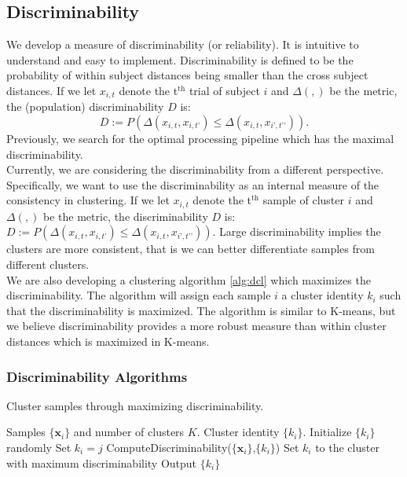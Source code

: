 \documentclass[simplex.tex]{subfiles}
\providecommand{\mb}[1]{\boldsymbol{#1}}
\newcommand{\bx}{\mb{x}}
\begin{document}
\subsection{Discriminability}
We develop a measure of discriminability (or reliability).  It
is intuitive to understand and easy to implement.
Discriminability is defined to be the probability of within
subject distances being smaller than the cross subject
distances. If we let $x_{i,t}$ denote the t$^{\text{th}}$ trial of subject 
$i$ and $\Delta(,)$ be the metric, the (population) discriminability $D$
is: 
\[D:= P (\Delta(x_{i,t} , x_{i,t’}) \leq  \Delta(x_{i,t} , x_{i’,t’’})).\]
Previously, we search for the optimal processing pipeline which has the
maximal discriminability. 
\\
Currently, we are considering the discriminability from a different perspective. Specifically, we want to use the discriminability as an internal measure of the consistency in clustering. If we let $x_{i,t}$ denote the t$^{\text{th}}$ sample of cluster 
$i$ and $\Delta(,)$ be the metric, the discriminability $D$
is: $D:= P (\Delta(x_{i,t} , x_{i,t’}) \leq  \Delta(x_{i,t} , x_{i’,t’’}))$. Large discriminability implies the clusters are more consistent, that is we can better differentiate samples from different clusters. 
\\
We are also developing a clustering algorithm \ref{alg:dcl} which maximizes the discriminability. The algorithm will assign each sample $i$ a cluster identity $k_i$ such that the discriminability is maximized. The algorithm is similar to K-means, but we believe discriminability provides a more robust measure than within cluster distances which is maximized in K-means.


\subsubsection*{Discriminability Algorithms}

\begin{algorithm}               
	\caption{Cluster samples through maximizing discriminability.  }   
	\label{alg:dcl}                       
	\begin{algorithmic}                    
		\Require Samples $\{\bx_{i}\}$ and number of clusters $K$.
		\Ensure Cluster identity $\{k_{i}\}$. 
		\State Initialize $\{k_{i}\}$ randomly
		\State Set $k_{i} = j$ 
		\State ComputeDiscriminability($\{\bx_{i}\}$,$\{k_{i}\}$)
		\EndFor
		\State Set $k_{i}$ to the cluster with maximum discriminability
		\EndFor 
		\EndWhile
		\State Output $\{k_{i}\}$ 
		\EndFunction
	\end{algorithmic}
\end{algorithm}
\end{document}
